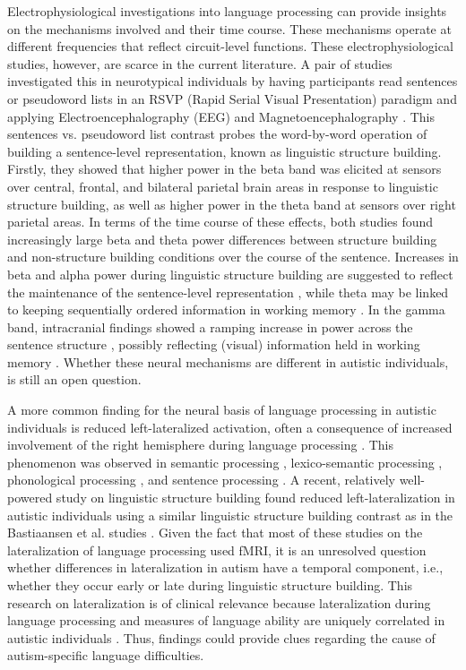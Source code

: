 Electrophysiological investigations into language processing can provide insights on the mechanisms involved and their time course. These mechanisms operate at different frequencies that reflect circuit-level functions. These electrophysiological studies, however, are scarce in the current literature. A pair of studies investigated this in neurotypical individuals by having participants read sentences or pseudoword lists in an RSVP (Rapid Serial Visual Presentation) paradigm and applying Electroencephalography (EEG) and Magnetoencephalography \citep[MEG;][]{bastiaansen2010,bastiaansen2015}. This sentences vs. pseudoword list contrast probes the word-by-word operation of building a sentence-level representation, known as linguistic structure building. Firstly, they showed that higher power in the beta band was elicited at sensors over central, frontal, and bilateral parietal brain areas in response to linguistic structure building, as well as higher power in the theta band at sensors over right parietal areas. In terms of the time course of these effects, both studies found increasingly large beta and theta power differences between structure building and non-structure building conditions over the course of the sentence. Increases in beta and alpha power during linguistic structure building are suggested to reflect the maintenance of the sentence-level representation \citep{engel2010,lewis2016}, while theta may be linked to keeping sequentially ordered information in working memory \citep{roux2014,vignali2016}. In the gamma band, intracranial findings showed a ramping increase in power across the sentence structure \citep{fedorenko2016}, possibly reflecting (visual) information held in working memory \citep{bastos2018,honkanen2015,roux2014,vignali2016}. Whether these neural mechanisms are different in autistic individuals, is still an open question.

A more common finding for the neural basis of language processing in autistic individuals is reduced left-lateralized activation, often a consequence of increased involvement of the right hemisphere during language processing \citep{herringshaw2016}. This phenomenon was observed in semantic processing \citep{knaus2008}, lexico-semantic processing \citep{coffeycorina2008}, phonological processing \citep{dawson1986}, and sentence processing \citep{muller1999}. A recent, relatively well-powered study on linguistic structure building found reduced left-lateralization in autistic individuals using a similar linguistic structure building contrast as in the Bastiaansen et al. studies \citep{jouravlev2020}. Given the fact that most of these studies on the lateralization of language processing used fMRI, it is an unresolved question whether differences in lateralization in autism have a temporal component, i.e., whether they occur early or late during linguistic structure building. This research on lateralization is of clinical relevance because lateralization during language processing and measures of language ability are uniquely correlated in autistic individuals \citep{lindell2013}. Thus, findings could provide clues regarding the cause of autism-specific language difficulties. 

